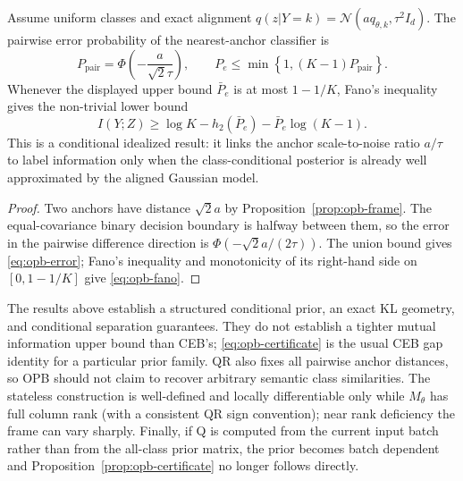\begin{corollary}
\label{cor:opb-fano}
Assume uniform classes and exact alignment
$q(z|Y=k)=\mathcal{N}(a q_{\theta,k},\tau^2I_d)$. The pairwise error probability of
the nearest-anchor classifier is
\begin{equation}
P_{\mathrm{pair}} = \Phi\!\left(-\frac{a}{\sqrt{2}\tau}\right),
\qquad
P_e \le \min\left\{1,(K-1)P_{\mathrm{pair}}\right\}.
\label{eq:opb-error}
\end{equation}
Whenever the displayed upper bound $\bar P_e$ is at most $1-1/K$, Fano's inequality
gives the non-trivial lower bound
\begin{equation}
I(Y;Z)
\ge \log K-h_2(\bar P_e)-\bar P_e\log(K-1).
\label{eq:opb-fano}
\end{equation}
This is a conditional idealized result: it links the anchor scale-to-noise ratio
$a/\tau$ to label information only when the class-conditional posterior is already
well approximated by the aligned Gaussian model.
\end{corollary}

\begin{proof}
Two anchors have distance $\sqrt{2}a$ by Proposition~\ref{prop:opb-frame}. The
equal-covariance binary decision boundary is halfway between them, so the error in
the pairwise difference direction is
$\Phi(-\sqrt{2}a/(2\tau))$. The union bound gives \eqref{eq:opb-error}; Fano's
inequality and monotonicity of its right-hand side on $[0,1-1/K]$ give
\eqref{eq:opb-fano}.
\end{proof}

\begin{remark}
\label{rem:opb-scope}
The results above establish a structured conditional prior, an exact KL geometry,
and conditional separation guarantees. They do not establish a tighter mutual
information upper bound than CEB's; \eqref{eq:opb-certificate} is the usual CEB gap
identity for a particular prior family. QR also fixes all pairwise anchor distances,
so OPB should not claim to recover arbitrary semantic class similarities. The
stateless construction is well-defined and locally differentiable only while
$M_\theta$ has full column rank (with a consistent QR sign convention); near rank
deficiency the frame can vary sharply. Finally, if Q is computed from the current
input batch rather than from the all-class prior matrix, the prior becomes batch
dependent and Proposition~\ref{prop:opb-certificate} no longer follows directly.
\end{remark}
